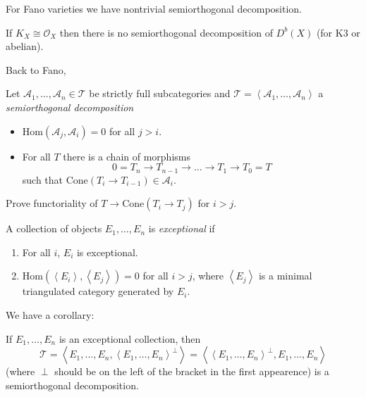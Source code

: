 For Fano varieties we have nontrivial semiorthogonal decomposition.

\begin{remark}
\label{remark-CY-have-no-semiorthogonal-decomposition}
If $K_X \cong \mathcal{O}_X$ then there is no semiorthogonal decomposition of
$D^b(X)$ (for K3 or abelian).
\end{remark}

Back to Fano,
\begin{definition}
\label{definition-semiorthogonal-decomposition-for-several-categories}
Let $\mathcal{A}_1,\ldots,\mathcal{A}_n \in \mathcal{T}$ be strictly full
subcategories and $\mathcal{T}=\left<\mathcal{A}_1,\ldots,\mathcal{A}_n\right>$ 
a {\it semiorthogonal decomposition}
\begin{itemize}
\item $\text{Hom}(\mathcal{A}_j,\mathcal{A}_i)=0$ for all $j>i$.
 \item For all $T$ there is a chain of morphisms
 $$
0 = T_n \to T_{n-1}\to \ldots \to T_1 \to T_0=T
$$
such that $\text{Cone}(T_i \to T_{i-1}) \in \mathcal{A}_i$.
\end{itemize}
\end{definition}

\begin{exercise}
\label{exercise-functoriality-and-cone}
Prove functoriality of $T \to \text{Cone}(T_i \to T_j)$ for $i>j$.
\end{exercise}

\begin{definition}
\label{definition-exceptional-collection-of-objects}
A collection of objects $E_1,\ldots, E_n$ is {\it exceptional} if
 \begin{enumerate}
\item For all $i$, $E_i$ is exceptional.
\item $\text{Hom}(\left<E_i\right>,\left<E_j\right>)=0$ for all $i>j$, where
$\left<E_j\right>$ is a minimal triangulated category generated by $E_i$.
\end{enumerate}
\end{definition}

We have a corollary:

\begin{lemma}
\label{lemma-exceptional-collection-gives-semiorthogonal-decomposition}
If $E_1,\ldots,E_n$ is an exceptional collection, then
$$
\mathcal{T}=\left<E_1,\ldots,E_n,\left<E_1,\ldots,E_n\right>^\perp\right>
=\left<\left<E_1,\ldots,E_n\right>^\perp,E_1,\ldots,E_n\right>
$$
(where $\perp$ should be on the left of the bracket in the first appearence) 
is a semiorthogonal decomposition.
\end{lemma}

